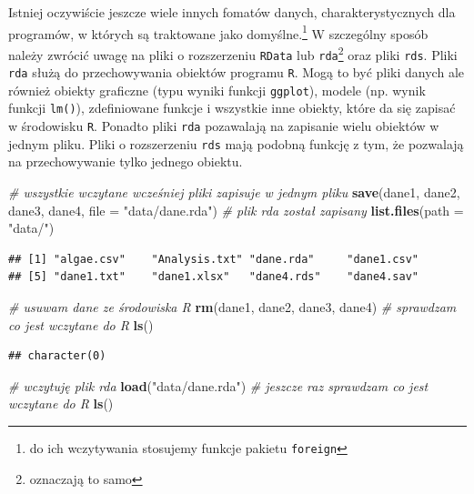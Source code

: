 \documentclass[]{book}
\newenvironment{Shaded}{\begin{snugshade}}{\end{snugshade}}
\newcommand{\CommentTok}[1]{\textcolor[rgb]{0.56,0.35,0.01}{\textit{#1}}}
\newcommand{\DataTypeTok}[1]{\textcolor[rgb]{0.13,0.29,0.53}{#1}}
\newcommand{\KeywordTok}[1]{\textcolor[rgb]{0.13,0.29,0.53}{\textbf{#1}}}
\newcommand{\NormalTok}[1]{#1}
\newcommand{\StringTok}[1]{\textcolor[rgb]{0.31,0.60,0.02}{#1}}
\let\rmarkdownfootnote\footnote%
\def\footnote{\protect\rmarkdownfootnote}
\theoremstyle{plain}
\theoremstyle{definition}
\theoremstyle{definition}
\theoremstyle{definition}
\theoremstyle{definition}
\theoremstyle{remark}
\begin{document}
Istniej oczywiście jeszcze wiele innych fomatów danych, charakterystycznych dla programów, w których są traktowane jako domyślne.\footnote{do ich wczytywania stosujemy funkcje pakietu \texttt{foreign}} W szczególny sposób należy zwrócić uwagę na pliki o rozszerzeniu \texttt{RData} lub \texttt{rda}\footnote{oznaczają to samo} oraz pliki \texttt{rds}. Pliki \texttt{rda} służą do przechowywania obiektów programu \texttt{R}. Mogą to być pliki danych ale również obiekty graficzne (typu wyniki funkcji \texttt{ggplot}), modele (np. wynik funkcji \texttt{lm()}), zdefiniowane funkcje i wszystkie inne obiekty, które da się zapisać w środowisku \texttt{R}. Ponadto pliki \texttt{rda} pozawalają na zapisanie wielu obiektów w jednym pliku. Pliki o rozszerzeniu \texttt{rds} mają podobną funkcję z tym, że pozwalają na przechowywanie tylko jednego obiektu.

\begin{Shaded}
\begin{Highlighting}[]
\CommentTok{# wszystkie wczytane wcześniej pliki zapisuje w jednym pliku}
\KeywordTok{save}\NormalTok{(dane1, dane2, dane3, dane4, }\DataTypeTok{file =} \StringTok{"data/dane.rda"}\NormalTok{)}
\CommentTok{# plik rda został zapisany}
\KeywordTok{list.files}\NormalTok{(}\DataTypeTok{path =} \StringTok{"data/"}\NormalTok{)}
\end{Highlighting}
\end{Shaded}

\begin{verbatim}
## [1] "algae.csv"    "Analysis.txt" "dane.rda"     "dane1.csv"   
## [5] "dane1.txt"    "dane1.xlsx"   "dane4.rds"    "dane4.sav"
\end{verbatim}

\begin{Shaded}
\begin{Highlighting}[]
\CommentTok{# usuwam dane ze środowiska R}
\KeywordTok{rm}\NormalTok{(dane1, dane2, dane3, dane4)}
\CommentTok{# sprawdzam co jest wczytane do R}
\KeywordTok{ls}\NormalTok{()}
\end{Highlighting}
\end{Shaded}

\begin{verbatim}
## character(0)
\end{verbatim}

\begin{Shaded}
\begin{Highlighting}[]
\CommentTok{# wczytuję plik rda}
\KeywordTok{load}\NormalTok{(}\StringTok{"data/dane.rda"}\NormalTok{)}
\CommentTok{# jeszcze raz sprawdzam co jest wczytane do R}
\KeywordTok{ls}\NormalTok{()}
\end{Highlighting}
\end{Shaded}
\end{document}
